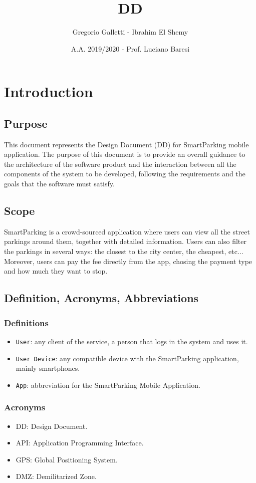 \documentclass[11pt]{article} %
\title{DD}
\author{Gregorio Galletti - Ibrahim El Shemy}
\date{A.A. 2019/2020 - Prof. Luciano Baresi} %
\begin{document}
\maketitle
\tableofcontents
\newpage

\section{Introduction}

\subsection{Purpose}
This document represents the Design Document (DD) for SmartParking mobile application. The purpose of this document is to provide an overall guidance to the architecture of the software product and the interaction between all the components of the system to be developed, following the requirements and the goals that the software must satisfy.

\subsection{Scope}
SmartParking is a crowd-sourced application where users can view all the street parkings around them, together with detailed information. Users can also filter the parkings in several ways: the closest to the city center, the cheapest, etc... Moreover, users can pay the fee directly from the app, chosing the payment type and how much they want to stop.

\subsection{Definition, Acronyms, Abbreviations}

\subsubsection{Definitions}
\begin{itemize}
\item \texttt{User}: any client of the service, a person that logs in the system and uses it.
\item \texttt{User Device}: any compatible device with the SmartParking application, mainly smartphones.
\item \texttt{App}: abbreviation for the SmartParking Mobile Application.
\end{itemize}

\subsubsection{Acronyms}
\begin{itemize}
\item DD: Design Document.
\item API: Application Programming Interface.
\item GPS: Global Positioning System.
\item DMZ: Demilitarized Zone.
\end{itemize}
\end{document}
